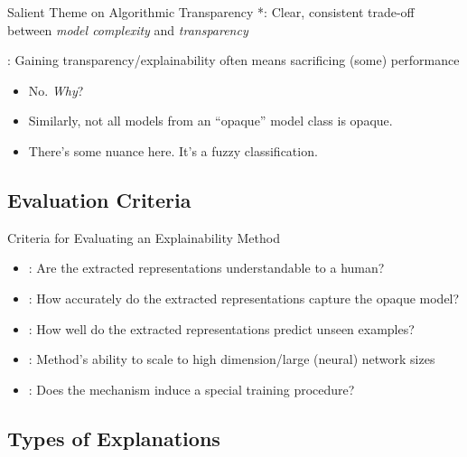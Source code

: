 \documentclass[11pt,dvipsnames,usenames,aspectratio=169]{beamer}  %
\begin{document}
\begin{frame}{Salient Theme on Algorithmic Transparency}
  *:  Clear, consistent trade-off between \textit{model complexity} and \textit{transparency}

  \vspace{16pt}
  \textbf{}: Gaining transparency/explainability often means sacrificing (some) performance

  \vspace{16pt}
  \begin{itemize}[<+->]
    \item No.  \textit{Why}?
    \item Similarly, not all models from an ``opaque'' model class is opaque.
    \item There's some nuance here.  It's a fuzzy classification.
  \end{itemize}

\end{frame}

\subsection{Evaluation Criteria}

\begin{frame}{Criteria for Evaluating an Explainability Method}
  \begin{itemize}[<+->]
    \setlength{\itemsep}{19pt}
    \item {}: Are the extracted representations understandable to a human?
    \item {}: How accurately do the extracted representations capture the opaque model?
    \item {}: How well do the extracted representations predict unseen examples?
    \item {}: Method's ability to scale to high dimension/large (neural) network sizes
    \item {}: Does the mechanism induce a special training procedure?
  \end{itemize}
\end{frame}

\subsection{Types of Explanations}
\end{document}
